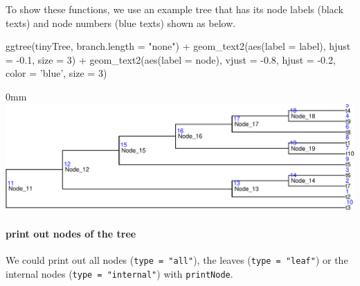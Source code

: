 \documentclass[]{article}
\newcommand{\hlnum}[1]{\textcolor[rgb]{0.816,0.125,0.439}{#1}}%
\newcommand{\hlstr}[1]{\textcolor[rgb]{0.251,0.627,0.251}{#1}}%
\newcommand{\hlopt}[1]{\textcolor[rgb]{0,0,0}{#1}}%
\newcommand{\hlstd}[1]{\textcolor[rgb]{0.251,0.251,0.251}{#1}}%
\newcommand{\hlkwc}[1]{\textcolor[rgb]{0.251,0.251,0.251}{#1}}%
\newcommand{\hlkwd}[1]{\textcolor[rgb]{0.878,0.439,0.125}{#1}}%
\newenvironment{Shaded}{\begin{myshaded}}{\end{myshaded}}
\newcommand{\KeywordTok}[1]{\hlkwd{#1}}
\newcommand{\DataTypeTok}[1]{\hlkwc{#1}}
\newcommand{\DecValTok}[1]{\hlnum{#1}}
\newcommand{\FloatTok}[1]{\hlnum{#1}}
\newcommand{\StringTok}[1]{\hlstr{#1}}
\newcommand{\OperatorTok}[1]{\hlopt{#1}}
\newcommand{\NormalTok}[1]{\hlstd{#1}}
\begin{document}
To show these functions, we use an example tree that has its node labels (black texts) and node numbers (blue texts) shown as below.

\begin{Shaded}
\begin{Highlighting}[]
\KeywordTok{ggtree}\NormalTok{(tinyTree, }\DataTypeTok{branch.length =} \StringTok{"none"}\NormalTok{) }\OperatorTok{+}
\StringTok{    }\KeywordTok{geom_text2}\NormalTok{(}\KeywordTok{aes}\NormalTok{(}\DataTypeTok{label =}\NormalTok{ label), }\DataTypeTok{hjust =} \FloatTok{-0.1}\NormalTok{, }\DataTypeTok{size =} \DecValTok{3}\NormalTok{) }\OperatorTok{+}
\StringTok{    }\KeywordTok{geom_text2}\NormalTok{(}\KeywordTok{aes}\NormalTok{(}\DataTypeTok{label =}\NormalTok{ node), }\DataTypeTok{vjust =} \FloatTok{-0.8}\NormalTok{,}
               \DataTypeTok{hjust =} \FloatTok{-0.2}\NormalTok{, }\DataTypeTok{color =} \StringTok{'blue'}\NormalTok{, }\DataTypeTok{size =} \DecValTok{3}\NormalTok{) }
\end{Highlighting}
\end{Shaded}

\begin{adjustwidth}{\fltoffset}{0mm}
\includegraphics{figure/unnamed-chunk-25-1} \end{adjustwidth}

\hypertarget{print-out-nodes-of-the-tree}{%
\paragraph{print out nodes of the tree}\label{print-out-nodes-of-the-tree}}

We could print out all nodes (\texttt{type = "all"}), the leaves (\texttt{type = "leaf"}) or the internal nodes (\texttt{type = "internal"}) with \texttt{printNode}.
\end{document}
